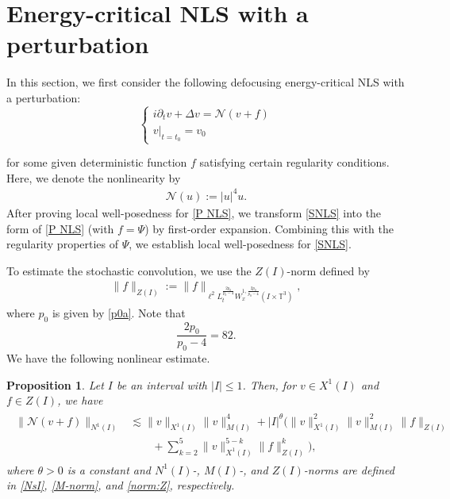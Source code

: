 \documentclass[letterpaper, 11pt,  reqno]{amsart}
\newtheorem{proposition}[theorem]{Proposition}
\newcommand{\1}{\hspace{0.5mm}\text{I}\hspace{0.5mm}}
\newcommand{\noi}{\noindent}
\newcommand{\T}{\mathbb{T}}
\renewcommand{\l}{\ell}
\newcommand{\les}{\lesssim}
\newcommand{\NN}{\mathcal{N}}
\numberwithin{equation}{section}
\numberwithin{theorem}{section}
\begin{document}
\section{Energy-critical NLS with a perturbation}
\label{SEC:Local}


In this section, we first consider the following defocusing energy-critical NLS with a perturbation:
\begin{equation}\label{P NLS}
\begin{cases}
    i\partial_t v+\Delta v=
\NN(v+f)\\
    v|_{t=t_0}=v_0
\end{cases}
\end{equation}


\noi
for some
given deterministic function $f$ satisfying certain regularity conditions.
Here, 
we denote the nonlinearity by
\begin{align}
\label{P-non}
\NN(u):=
|u|^4 u.
\end{align}
After proving local well-posedness for \eqref{P NLS}, 
we transform \eqref{SNLS} into the form of \eqref{P NLS} (with $f =\Psi$) by first-order expansion. Combining this with the regularity properties of $\Psi$, we establish local well-posedness for \eqref{SNLS}.


To estimate the stochastic convolution,
we use the $Z(I)$-norm defined by
\begin{align}\label{norm:Z}
\|f\|_{Z(I)}
:=
\| f \|_{\l^2 L_t^{\frac{2p_0}{p_0-4}} W_x^{1, \frac{2p_0}{p_0-4}}(I\times\T^3)}
,
\end{align}
where $p_0$ is given by \eqref{p0a}.
Note that
\[
\frac{2p_0}{p_0-4}
= 82.
\]
We have the following nonlinear estimate.





\begin{proposition}\label{Prop:non est}
Let 
$I$ be an interval with $|I|\leq 1$.
Then,
for $v\in X^1(I)$ and $f \in Z(I)$,
we have
\begin{align}
\label{eq:non-est}
\begin{aligned}
\big \|
\NN (v+f)
\big \|_{N^1(I)}
&\les
\|v\|_{X^1(I)}
\|v\|_{M(I)}^4
+ |I|^\theta
\Big(
\|v\|_{X^1(I)}^2
\|v\|^2_{M(I)}
\|f\|_{Z(I)}
\\
&\qquad
+
\sum_{k=2}^5
\|v\|_{X^1(I)}^{5-k}
\|f\|_{Z(I)}^k
\Big),
\end{aligned}
\end{align}
where
$\theta >0$ is a constant
and
$N^1(I)$-, $M(I)$-, and $Z(I)$-norms are defined in \eqref{NsI}, \eqref{M-norm}, and \eqref{norm:Z}, respectively.
\end{proposition}
\end{document}
